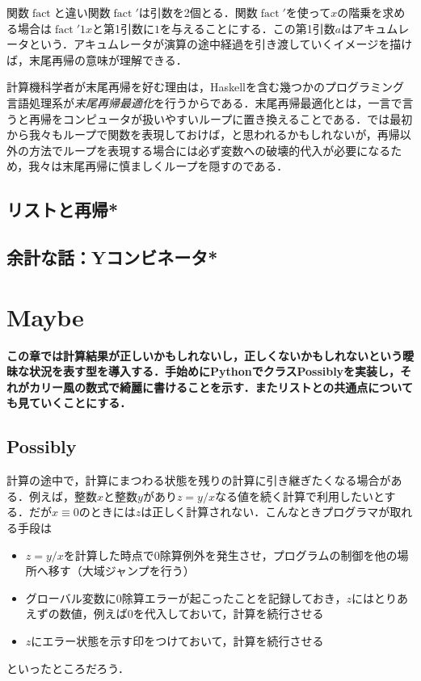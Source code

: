 \documentclass[twocolumn]{jsbook}
\newcommand{\programminglanguage}[1]{\textsf{#1}}
\newcommand{\haskell}{\programminglanguage{Haskell}}
\newcommand{\python}{\programminglanguage{Python}}
\newcommand{\keyword}[1]{{\emph{#1}}}
\newenvironment{leader}{\begingroup\bf}{\endgroup}
\DeclareMathOperator{\mathFactorial}{fact}
\begin{document}
関数$\mathFactorial$と違い関数$\mathFactorial'$は引数を2個とる．関数$\mathFactorial'$を使って$x$の階乗を求める場合は$\mathFactorial'1x$と第1引数に$1$を与えることにする．この第1引数$a$はアキュムレータという．アキュムレータが演算の途中経過を引き渡していくイメージを描けば，末尾再帰の意味が理解できる．

計算機科学者が末尾再帰を好む理由は，\haskell を含む幾つかのプログラミング言語処理系が\keyword{末尾再帰最適化}を行うからである．末尾再帰最適化とは，一言で言うと再帰をコンピュータが扱いやすいループに置き換えることである．では最初から我々もループで関数を表現しておけば，と思われるかもしれないが，再帰以外の方法でループを表現する場合には必ず変数への破壊的代入が必要になるため，我々は末尾再帰に慎ましくループを隠すのである．

\section{リストと再帰*}

\section{余計な話：Yコンビネータ*}


\chapter{Maybe}

\begin{leader}
この章では計算結果が正しいかもしれないし，正しくないかもしれないという曖昧な状況を表す型を導入する．手始めに\python でクラスPossiblyを実装し，それがカリー風の数式で綺麗に書けることを示す．またリストとの共通点についても見ていくことにする．
\end{leader}

\section{Possibly}

計算の途中で，計算にまつわる状態を残りの計算に引き継ぎたくなる場合がある．例えば，整数$x$と整数$y$があり$z=y/x$なる値を続く計算で利用したいとする．だが$x\equiv0$のときには$z$は正しく計算されない．こんなときプログラマが取れる手段は
\begin{itemize}
\item $z=y/x$を計算した時点で$0$除算例外を発生させ，プログラムの制御を他の場所へ移す（大域ジャンプを行う）
\item グローバル変数に$0$除算エラーが起こったことを記録しておき，$z$にはとりあえずの数値，例えば$0$を代入しておいて，計算を続行させる
\item $z$にエラー状態を示す印をつけておいて，計算を続行させる
\end{itemize}
といったところだろう．
\end{document}
